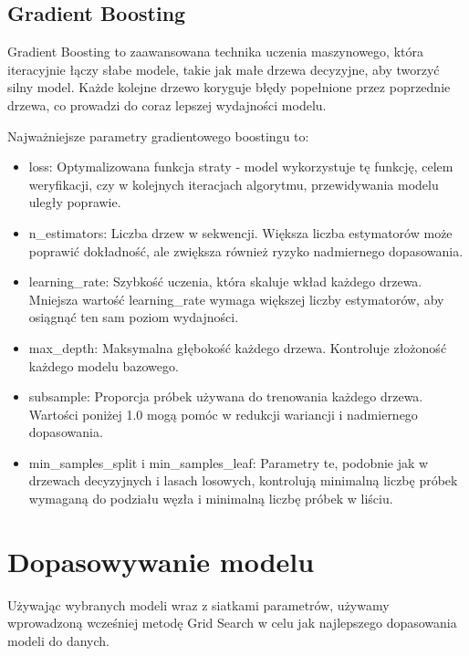 \documentclass{article}
\begin{document}
\subsection{Gradient Boosting}
Gradient Boosting \cite{gradient_boosting} to zaawansowana technika uczenia maszynowego, która iteracyjnie łączy słabe modele, takie jak małe drzewa decyzyjne, aby tworzyć silny model. Każde kolejne drzewo koryguje błędy popełnione przez poprzednie drzewa, co prowadzi do coraz lepszej wydajności modelu.

Najważniejsze parametry gradientowego boostingu to:

\begin{itemize}
    \item loss: Optymalizowana funkcja straty - model wykorzystuje tę funkcję, celem weryfikacji, czy w kolejnych iteracjach algorytmu, przewidywania modelu uległy poprawie. 
    \item n\_estimators: Liczba drzew w sekwencji. Większa liczba estymatorów może poprawić dokładność, ale zwiększa również ryzyko nadmiernego dopasowania.
    \item learning\_rate: Szybkość uczenia, która skaluje wkład każdego drzewa. Mniejsza wartość learning\_rate wymaga większej liczby estymatorów, aby osiągnąć ten sam poziom wydajności.
    \item max\_depth: Maksymalna głębokość każdego drzewa. Kontroluje złożoność każdego modelu bazowego.
    \item subsample: Proporcja próbek używana do trenowania każdego drzewa. Wartości poniżej 1.0 mogą pomóc w redukcji wariancji i nadmiernego dopasowania.
    \item min\_samples\_split i min\_samples\_leaf: Parametry te, podobnie jak w drzewach decyzyjnych i lasach losowych, kontrolują minimalną liczbę próbek wymaganą do podziału węzła i minimalną liczbę próbek w liściu.
\end{itemize}

\section{Dopasowywanie modelu}
Używając wybranych modeli wraz z siatkami parametrów, używamy wprowadzoną wcześniej metodę Grid Search w celu jak najlepszego dopasowania modeli do danych.
\end{document}
